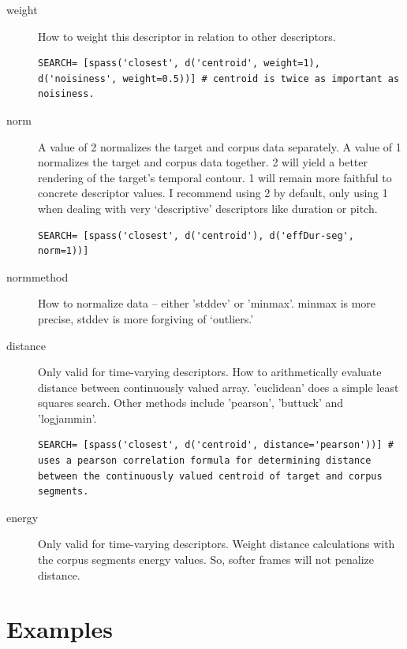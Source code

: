 \documentclass{article}
\begin{document}
\begin{spacing}{1.2}
\begin{description}

\item[weight] How to weight this descriptor in relation to other descriptors.

\begin{lstlisting}
SEARCH= [spass('closest', d('centroid', weight=1), d('noisiness', weight=0.5))] # centroid is twice as important as noisiness.
\end{lstlisting}

\item[norm] A value of 2 normalizes the target and corpus data separately.  A value of 1 normalizes the target and corpus data together.  2 will yield a better rendering of the target's temporal contour.  1 will remain more faithful to concrete descriptor values.  I recommend using 2 by default, only using 1 when dealing with very `descriptive' descriptors like duration or pitch.

\begin{lstlisting}
SEARCH= [spass('closest', d('centroid'), d('effDur-seg', norm=1))]
\end{lstlisting}

\item[normmethod] How to normalize data -- either 'stddev' or 'minmax'.  minmax is more precise, stddev is more forgiving of `outliers.'

\item[distance] Only valid for time-varying descriptors.  How to arithmetically evaluate distance between continuously valued array.  'euclidean' does a simple least squares search.  Other methods include 'pearson', 'buttuck' and 'logjammin'.

\begin{lstlisting}
SEARCH= [spass('closest', d('centroid', distance='pearson'))] # uses a pearson correlation formula for determining distance between the continuously valued centroid of target and corpus segments.
\end{lstlisting}

\item[energy] Only valid for time-varying descriptors.  Weight distance calculations with the corpus segments energy values.  So, softer frames will not penalize distance.
\end{description}

\section{Examples}

\end{spacing}
\end{document}
